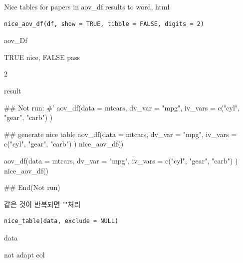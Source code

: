 \documentclass[a4paper]{book}
\begin{document}
%
\begin{Description}
Nice tables for papers in aov\_df results  to  word, html
\end{Description}
%
\begin{Usage}
\begin{verbatim}
nice_aov_df(df, show = TRUE, tibble = FALSE, digits = 2)
\end{verbatim}
\end{Usage}
%
\begin{Arguments}
\begin{ldescription}
\item[\code{df}] aov\_Df

\item[\code{show}] TRUE nice, FALSE pass

\item[\code{digits}] 2
\end{ldescription}
\end{Arguments}
%
\begin{Value}
result
\end{Value}
%
\begin{Examples}
\begin{ExampleCode}

\#\# Not run: 
#'
aov_df(data = mtcars,
       dv_var = "mpg",
       iv_vars = c("cyl", "gear", "carb") )

## generate nice table
aov_df(data = mtcars,
       dv_var = "mpg",
       iv_vars = c("cyl", "gear", "carb") )%
  nice_aov_df()


aov_df(data = mtcars,
       dv_var = "mpg",
       iv_vars = c("cyl", "gear", "carb") )%
  nice_aov_df() %



## End(Not run)
\end{ExampleCode}
\end{Examples}
%
\begin{Description}
같은 것이 반복되면 ""처리
\end{Description}
%
\begin{Usage}
\begin{verbatim}
nice_table(data, exclude = NULL)
\end{verbatim}
\end{Usage}
%
\begin{Arguments}
\begin{ldescription}
\item[\code{data}] data

\item[\code{exclude}] not adapt col
\end{ldescription}
\end{Arguments}
\end{document}
